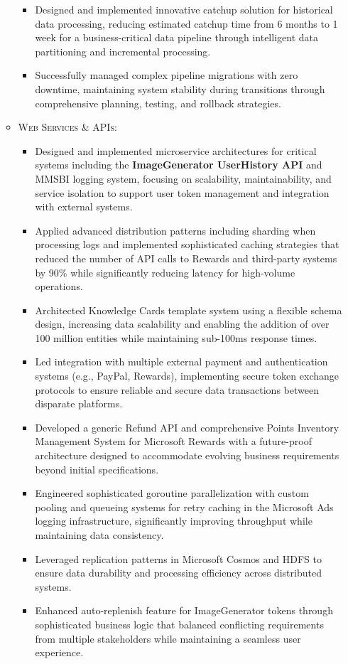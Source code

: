 \begin{itemize}
\begin{itemize}
\begin{itemize}
            \item \scriptsize{Designed and implemented innovative catchup solution for historical data processing, reducing estimated catchup time from 6 months to 1 week for a business-critical data pipeline through intelligent data partitioning and incremental processing.}
            \item \scriptsize{Successfully managed complex pipeline migrations with zero downtime, maintaining system stability during transitions through comprehensive planning, testing, and rollback strategies.}
        \end{itemize}

        \item \scriptsize{\textsc{Web Services \& APIs:}}
        \begin{itemize}
            \item \scriptsize{Designed and implemented microservice architectures for critical systems including the \textbf{ImageGenerator UserHistory API} and MMSBI logging system, focusing on scalability, maintainability, and service isolation to support user token management and integration with external systems.}
            \item \scriptsize{Applied advanced distribution patterns including sharding when processing logs and implemented sophisticated caching strategies that reduced the number of API calls to Rewards and third-party systems by 90\% while significantly reducing latency for high-volume operations.}
            \item \scriptsize{Architected Knowledge Cards template system using a flexible schema design, increasing data scalability and enabling the addition of over 100 million entities while maintaining sub-100ms response times.}
            \item \scriptsize{Led integration with multiple external payment and authentication systems (e.g., PayPal, Rewards), implementing secure token exchange protocols to ensure reliable and secure data transactions between disparate platforms.}
            \item \scriptsize{Developed a generic Refund API and comprehensive Points Inventory Management System for Microsoft Rewards with a future-proof architecture designed to accommodate evolving business requirements beyond initial specifications.}
            \item \scriptsize{Engineered sophisticated goroutine parallelization with custom pooling and queueing systems for retry caching in the Microsoft Ads logging infrastructure, significantly improving throughput while maintaining data consistency.}
            \item \scriptsize{Leveraged replication patterns in Microsoft Cosmos and HDFS to ensure data durability and processing efficiency across distributed systems.}
            \item \scriptsize{Enhanced auto-replenish feature for ImageGenerator tokens through sophisticated business logic that balanced conflicting requirements from multiple stakeholders while maintaining a seamless user experience.}
        \end{itemize}
        

\end{itemize}
\end{itemize}
